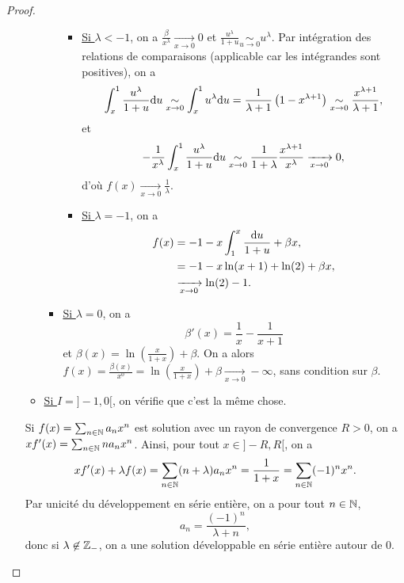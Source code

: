 \documentclass[12pt]{article}
\begin{document}
\begin{proof}
\begin{enumerate}
\begin{itemize}
\begin{itemize}
\begin{itemize}
					\item \underline{Si $\lambda<-1$}, on a $\frac{\beta}{x^{\lambda}}\xrightarrow[x\to0]{}0$ et $\frac{u^{\lambda}}{1+u}\underset{u\to0}{\sim}u^{\lambda}$. Par intégration des relations de comparaisons (applicable car les intégrandes sont positives), on a 
					\begin{equation}
						\int_{x}^{1}\frac{u^{\lambda}}{1+u}\mathrm{d} u\underset{x\to0}{\sim}\int_{x}^{1}u^{\lambda}\mathrm{d} u=\frac{1}{\lambda+1}\left(1-x^{\lambda+1}\right)\underset{x\to0}{\sim}\frac{x^{\lambda+1}}{\lambda+1},
					\end{equation}
					et
					\begin{equation}
						-\frac{1}{x^{\lambda}}\int_{x}^{1}\frac{u^{\lambda}}{1+u}\mathrm{d} u\underset{x\to0}{\sim}\frac{1}{1+\lambda}\frac{x^{\lambda+1}}{x^{\lambda}}\xrightarrow[x\to0]{}0,
					\end{equation}
					d'où $f(x)\xrightarrow[x\to0]{}\frac{1}{\lambda}$.

					\item \underline{Si $\lambda=-1$}, on a 
					\begin{align}
						f(x)
						&=-1-x\int_{1}^{x}\frac{\mathrm{d} u}{1+u}+\beta x,\\
						&=-1-x\ln(x+1)+\ln(2)+\beta x,\\
						&\xrightarrow[x\to0]{}\ln(2)-1.
					\end{align}
				\end{itemize}

				\item \underline{Si $\lambda=0$}, on a 
				\begin{equation}
					\beta'(x)=\frac{1}{x}-\frac{1}{x+1}
				\end{equation}
				et $\beta(x)=\ln\left(\frac{x}{1+x}\right)+\beta$. On a alors $f(x)=\frac{\beta(x)}{x^{0}}=\ln\left(\frac{x}{1+x}\right)+\beta\xrightarrow[x\to0]{}-\infty$, sans condition sur $\beta$.
			\end{itemize}

			\item \underline{Si $I=]-1,0[$}, on vérifie que c'est la même chose.
		\end{itemize}

		Si $f(x)=\sum_{n\in\mathbb{N}}a_n x^{n}$ est solution avec un rayon de convergence $R>0$, on a $xf'(x)=\sum_{n\in\mathbb{N}}na_nx^{n}$. Ainsi, pour tout $x\in]-R,R[$, on a
		\begin{equation}
			xf'(x)+\lambda f(x)=\sum_{n\in\mathbb{N}}(n+\lambda)a_nx^{n}=\frac{1}{1+x}=\sum_{n\in\mathbb{N}}(-1)^{n}x^{n}.
		\end{equation}
		Par unicité du développement en série entière, on a pour tout $n\in\mathbb{N}$,
		\begin{equation}
			a_n=\frac{(-1)^{n}}{\lambda+n},
		\end{equation}
		donc si $\lambda\not\in\mathbb{Z}_{-}$, on a une solution développable en série entière autour de 0.


\end{enumerate}
\end{proof}
\end{document}
